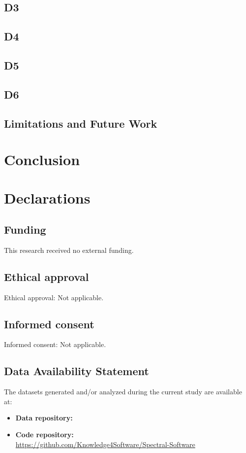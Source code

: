 \documentclass[authoryear,final,5p,times,twocolumn]{elsarticle}
\theoremstyle{plain}
\begin{document}
\subsection{D3}
\label{sec:d3}
\subsection{D4}
\label{sec:d4}
\subsection{D5}
\label{sec:d5}
\subsection{D6}
\label{sec:d6}

\subsection{Limitations and Future Work}
\label{sec:limitations}

\section{Conclusion}
\label{sec:conclusion}

\section{Declarations}

\subsection{Funding}
This research received no external funding.

\subsection{Ethical approval}
Ethical approval: Not applicable.

\subsection{Informed consent}
Informed consent: Not applicable.

\subsection{Data Availability Statement}
The datasets generated and/or analyzed during the current study are available at:
\begin{itemize}
    \item \textbf{Data repository:}\\ 
    \item \textbf{Code repository:}\\ \url{https://github.com/Knowledge4Software/Spectral-Software}
\end{itemize}
\end{document}
